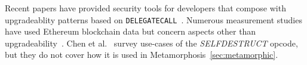 Recent papers have provided security tools for developers that compose with upgradeablity patterns based on  \texttt{DELEGATECALL}~\cite{rodler2021evmpatch,perez2022dissimilar}. Numerous measurement studies have used Ethereum blockchain data but concern aspects other than upgradeability~\cite{perez2019broken,chen2017adaptive,reijsbergen2021transaction,victor2019measuring,pinna2019massive,he2020characterizing}. Chen et al.~\cite{chen2021smart} survey use-cases of the \textit{SELFDESTRUCT} opcode, but they do not cover how it is used in Metamorphosis~\ref{sec:metamorphic}.





